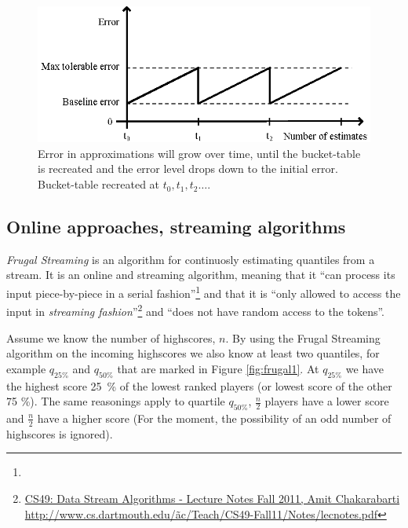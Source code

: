\begin{figure}[h]
  \centering
  \caption{Error in approximations will grow over time, until the bucket-table is recreated and the error level drops down to the initial error. Bucket-table recreated at $t_0, t_1, t_2 \dots$. 
  }
  \label{fig:errortime}
  \includegraphics[width=13cm]{img/error-over-time.eps}
\end{figure}
\newpage

\subsection{\label{frugal}Online approaches, streaming algorithms}

\emph{Frugal Streaming}\cite{frugal_streaming} is an algorithm for continuosly estimating quantiles from a stream. It is an online and streaming algorithm, meaning that it ``can process its input piece-by-piece in a serial fashion''\footnote{} and that it is ``only allowed to access the input in \emph{streaming fashion}''\footnote{\href{http://www.cs.dartmouth.edu/\~ac/Teach/CS49-Fall11/Notes/lecnotes.pdf}{CS49: Data Stream Algorithms - Lecture Notes Fall 2011, Amit Chakarabarti\\http://www.cs.dartmouth.edu/\~ac/Teach/CS49-Fall11/Notes/lecnotes.pdf}\label{fn}} and ``does not have random access to the tokens''.

Assume we know the number of highscores, $n$. By using the Frugal Streaming algorithm on the incoming highscores we also know at least two quantiles, for example $q_{25\%}$ and $q_{50\%}$ that are marked in Figure \ref{fig:frugal1}. At $q_{25\%}$ we have the highest score \mbox{25 \%} of the lowest ranked players (or lowest score of the other 75 \%). The same reasonings apply to quartile $q_{50\%}$, $\frac{n}{2}$ players have a lower score and $\frac{n}{2}$ have a higher score (For the moment, the possibility of an odd number of highscores is ignored).

